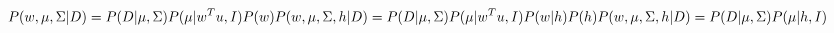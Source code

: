 \section{}
\[
   P(w, \mu, \Sigma| D) = P(D|\mu, \Sigma)P(\mu|w^Tu, I)P(w)\\
   P(w, \mu, \Sigma, h| D) = P(D|\mu, \Sigma)P(\mu|w^Tu, I)P(w|h)P(h)\\
   P(w, \mu, \Sigma, h| D) = P(D|\mu, \Sigma)P(\mu|h, I)\\
\]




























